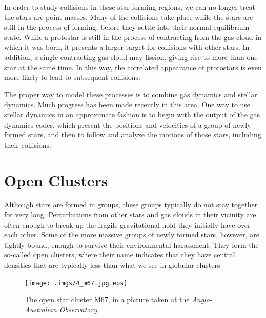\documentclass{book}
\begin{document}
In order to study collisions in these star forming regions, we can no
longer treat the stars are point masses.  Many of the collisions take
place while the stars are still in the process of forming, before they
settle into their normal equilibrium state.  While a protostar is
still in the process of contracting from the gas cloud in which it was
born, it presents a larger target for collisions with other stars.  In
addition, a single contracting gas cloud may fission, giving rise to
more than one star at the same time.  In this way, the correlated
appearance of protostars is even more likely to lead to subsequent
collisions.

The proper way to model these processes is to combine gas dynamics and
stellar dynamics.  Much progress has been made recently in this area.
One way to use stellar dynamics in an approximate fashion is to begin
with the output of the gas dynamics codes, which present the positions
and velocities of a group of newly formed stars, and then to follow
and analyze the motions of those stars, including their collisions.

\section{  Open Clusters}
\label{sect:9}

Although stars are formed in groups, these groups typically do not
stay together for very long.  Perturbations from other stars and gas
clouds in their vicinity are often enough to break up the fragile
gravitational hold they initially have over each other.  Some of the
more massive groups of newly formed stars, however, are tightly bound,
enough to survive their environmental harassment.  They form the
so-called open clusters, where their name indicates that they have
central densities that are typically less than what we see in globular
clusters.


 
\begin{figure}
\begin{minipage}{\columnwidth}
\begin{center}
\renewcommand{\thefootnote}{\alph{footnote}}
    \texttt{[image: .imgs/4\_m67.jpg.eps]}
\caption{The open star cluster M67, in a picture taken at the 
 {\it Anglo-Australian Observatory\protect \footnotemark[1]}.
}

\label{m67}
\end{center}
\end{minipage}
\end{figure}
\end{document}
